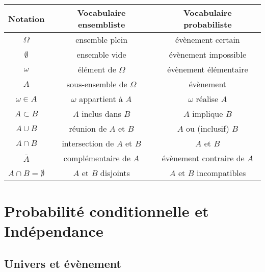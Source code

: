 \documentclass[10pt]{article}
\begin{document}
\begin{tabular}{|c|c|c|}
	\hline
	Notation               & Vocabulaire ensembliste    & Vocabulaire probabiliste   \\
	\hline
	$\Omega$               & ensemble plein             & évènement certain          \\
	\hline
	$\emptyset$            & ensemble vide              & évènement impossible       \\
	\hline
	$\omega$               & élément de $\Omega$        & évènement élémentaire      \\
	\hline
	$A$                    & sous-ensemble de $\Omega$  & évènement                  \\
	\hline
	$\omega \in A$         & $\omega$ appartient à $A$  & $\omega$ réalise $A$       \\
	\hline
	$A \subset B$          & $A$ inclus dans $B$        & $A$ implique $B$           \\
	\hline
	$A \cup B$             & réunion de $A$ et $B$      & $A$ ou (inclusif) $B$      \\
	\hline
	$A \cap B$             & intersection de $A$ et $B$ & $A$ et $B$                 \\
	\hline
	$\bar{A}$              & complémentaire de $A$      & évènement contraire de $A$ \\
	\hline
	$A \cap B = \emptyset$ & $A$ et $B$ disjoints       & $A$ et $B$ incompatibles   \\
	\hline
\end{tabular}

\newpage

\section{Probabilité conditionnelle et Indépendance}

\subsection{Univers et évènement}

\end{document}

